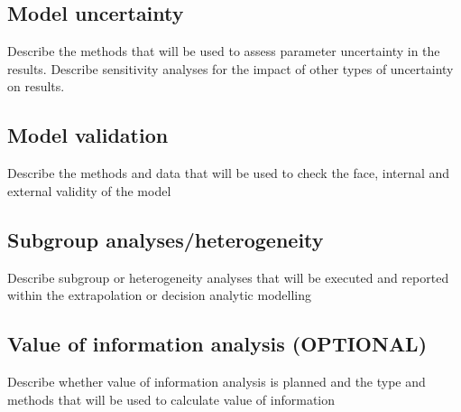 \subsection{Model uncertainty}

Describe the methods that will be used to assess parameter uncertainty
in the results. Describe sensitivity analyses for the impact of other
types of uncertainty on results.



\subsection{Model validation}

Describe the methods and data that will be used to check the face,
internal and external validity of the model


\subsection{Subgroup analyses/heterogeneity}

Describe subgroup or heterogeneity analyses that will be executed and
reported within the extrapolation or decision analytic modelling



\subsection{Value of information analysis (OPTIONAL)}

Describe whether value of information analysis is planned and the type
and methods that will be used to calculate value of information




